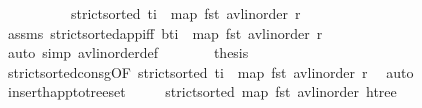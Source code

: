 \begin{isabellebody}
%
\isadelimproof
\ \ %
\endisadelimproof
%
\isatagproof
{}\isamarkupfalse%
\ {\isacharminus}{\kern0pt}\isanewline
\ \ \ \ \isamarkupfalse%
\ {\isachardoublequoteopen}strict{\isacharunderscore}{\kern0pt}sorted\ {\isacharparenleft}{\kern0pt}t\isactrlsub i\ {\isacharhash}{\kern0pt}\ map\ fst\ {\isacharparenleft}{\kern0pt}avl{\isacharunderscore}{\kern0pt}inorder\ r{\isacharparenright}{\kern0pt}{\isacharparenright}{\kern0pt}{\isachardoublequoteclose}\isanewline
\ \ \ \ \ \ \isamarkupfalse%
\ assms\ strict{\isacharunderscore}{\kern0pt}sorted{\isacharunderscore}{\kern0pt}app{\isacharunderscore}{\kern0pt}iff{\isacharbrackleft}{\kern0pt}\ b{\isacharequal}{\kern0pt}{\isachardoublequoteopen}t\isactrlsub i\ {\isacharhash}{\kern0pt}\ map\ fst\ {\isacharparenleft}{\kern0pt}avl{\isacharunderscore}{\kern0pt}inorder\ r{\isacharparenright}{\kern0pt}{\isachardoublequoteclose}{\isacharbrackright}{\kern0pt}\ \isanewline
\ \ \ \ \ \ \isamarkupfalse%
\ {\isacharparenleft}{\kern0pt}auto\ simp{\isacharcolon}{\kern0pt}\ avl{\isacharunderscore}{\kern0pt}inorder{\isacharunderscore}{\kern0pt}def{\isacharparenright}{\kern0pt}\isanewline
\ \ \ \ \isamarkupfalse%
\ \isamarkupfalse%
\ {\isacharquery}{\kern0pt}thesis\isanewline
\ \ \ \ \ \ \isamarkupfalse%
\ strict{\isacharunderscore}{\kern0pt}sorted{\isacharunderscore}{\kern0pt}consg{\isacharbrackleft}{\kern0pt}OF\ {\isacartoucheopen}strict{\isacharunderscore}{\kern0pt}sorted\ {\isacharparenleft}{\kern0pt}t\isactrlsub i\ {\isacharhash}{\kern0pt}\ map\ fst\ {\isacharparenleft}{\kern0pt}avl{\isacharunderscore}{\kern0pt}inorder\ r{\isacharparenright}{\kern0pt}{\isacharparenright}{\kern0pt}{\isacartoucheclose}{\isacharbrackright}{\kern0pt}\ \isamarkupfalse%
\ auto\isanewline
\ \ \isamarkupfalse%
%
\endisatagproof
{\isafoldproof}%
%
\isadelimproof
\isanewline
%
\endisadelimproof
\isanewline
\ \ \isamarkupfalse%
\ insert{\isacharunderscore}{\kern0pt}happ{\isacharunderscore}{\kern0pt}to{\isacharunderscore}{\kern0pt}tree{\isacharunderscore}{\kern0pt}set{\isacharcolon}{\kern0pt}\isanewline
\ \ \ \ \ {\isachardoublequoteopen}strict{\isacharunderscore}{\kern0pt}sorted\ {\isacharparenleft}{\kern0pt}map\ fst\ {\isacharparenleft}{\kern0pt}avl{\isacharunderscore}{\kern0pt}inorder\ htree{\isacharparenright}{\kern0pt}{\isacharparenright}{\kern0pt}{\isachardoublequoteclose}\isanewline

\end{isabellebody}
